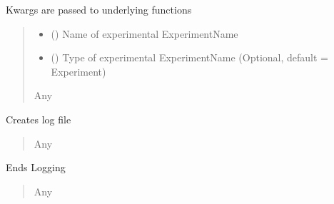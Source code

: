 \documentclass[letterpaper,10pt,english]{sphinxmanual}
\begin{document}
\begin{fulllineitems}
\begin{fulllineitems}
\sphinxAtStartPar
Kwargs are passed to underlying functions
\begin{quote}\begin{description}
\begin{itemize}
\item {} 
\sphinxAtStartPar
{} () \textendash{} Name of experimental ExperimentName

\item {} 
\sphinxAtStartPar
{} (\sphinxstyleliteralemphasis{\sphinxupquote{{[}}}\sphinxstyleliteralemphasis{\sphinxupquote{, }}\sphinxstyleliteralemphasis{\sphinxupquote{{]}}}) \textendash{} Type of experimental ExperimentName (Optional, default = Experiment)

\end{itemize}

\sphinxAtStartPar
Any

\end{description}\end{quote}

\end{fulllineitems}


\begin{fulllineitems}
\label{\detokenize{Organization:Organization.Mouse.create_log_file}}
\pysigstartsignatures
{}
\pysigstopsignatures
\sphinxAtStartPar
Creates log file
\begin{quote}\begin{description}
\sphinxAtStartPar
Any

\end{description}\end{quote}

\end{fulllineitems}


\begin{fulllineitems}
\label{\detokenize{Organization:Organization.Mouse.end_log}}
\pysigstartsignatures
{}
\pysigstopsignatures
\sphinxAtStartPar
Ends Logging
\begin{quote}\begin{description}
\sphinxAtStartPar
Any


\end{description}
\end{quote}
\end{fulllineitems}
\end{fulllineitems}
\end{document}
